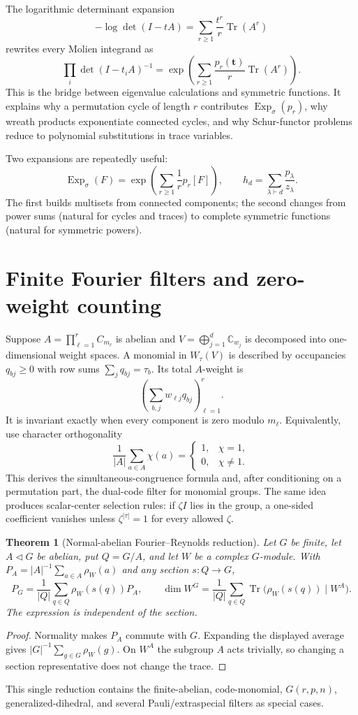 \documentclass[10pt]{article}
\newcommand{\Tr}{\operatorname{Tr}}
\newcommand{\ExpS}{\operatorname{Exp}_{\sigma}}
\newcommand{\C}{\mathbb C}
\newtheorem{theorem}{Theorem}
\begin{document}
The logarithmic determinant expansion
\[
-\log\det(I-tA)=\sum_{r\ge1}\frac{t^r}{r}\Tr(A^r)
\]
rewrites every Molien integrand as
\begin{equation}\label{eq:tool-plethystic}
\prod_i\det(I-t_iA)^{-1}
=\exp\!\left(\sum_{r\ge1}\frac{p_r(\mathbf t)}r\Tr(A^r)\right).
\end{equation}
This is the bridge between eigenvalue calculations and symmetric functions.
It explains why a permutation cycle of length $r$ contributes
$\ExpS(p_r)$, why wreath products exponentiate connected cycles, and why
Schur-functor problems reduce to polynomial substitutions in trace variables.

Two expansions are repeatedly useful:
\[
\ExpS(F)=\exp\!\left(\sum_{r\ge1}\frac1r p_r[F]\right),
\qquad
h_d=\sum_{\lambda\vdash d}\frac{p_\lambda}{z_\lambda}.
\]
The first builds multisets from connected components; the second changes from
power sums (natural for cycles and traces) to complete symmetric functions
(natural for symmetric powers).

\section{Finite Fourier filters and zero-weight counting}

Suppose $A=\prod_{\ell=1}^rC_{m_\ell}$ is abelian and
$V=\bigoplus_{j=1}^d\C_{w_j}$ is decomposed into one-dimensional weight
spaces.  A monomial in $W_\tau(V)$ is described by occupancies $q_{bj}\ge0$
with row sums $\sum_jq_{bj}=\tau_b$.  Its total $A$-weight is
\[
\left(\sum_{b,j}w_{\ell j}q_{bj}\right)_{\ell=1}^r.
\]
It is invariant exactly when every component is zero modulo $m_\ell$.
Equivalently, use character orthogonality
\[
\frac1{|A|}\sum_{a\in A}\chi(a)=
\begin{cases}1,&\chi=1,\\0,&\chi\ne1.\end{cases}
\]
This derives the simultaneous-congruence formula and, after conditioning on a
permutation part, the dual-code filter for monomial groups.  The same idea
produces scalar-center selection rules: if $\zeta I$ lies in the group, a
one-sided coefficient vanishes unless $\zeta^{|\tau|}=1$ for every allowed
$\zeta$.

\begin{theorem}[Normal-abelian Fourier--Reynolds reduction]
Let $G$ be finite, let $A\triangleleft G$ be abelian, put $Q=G/A$, and let
$W$ be a complex $G$-module. With
$P_A=|A|^{-1}\sum_{a\in A}\rho_W(a)$ and any section $s:Q\to G$,
\[
 P_G=\frac1{|Q|}\sum_{q\in Q}\rho_W(s(q))P_A,
 \qquad
 \dim W^G=\frac1{|Q|}\sum_{q\in Q}
 \Tr\bigl(\rho_W(s(q))\mid W^A\bigr).
\]
The expression is independent of the section.
\end{theorem}
\begin{proof}
Normality makes $P_A$ commute with $G$. Expanding the displayed average gives
$|G|^{-1}\sum_{g\in G}\rho_W(g)$. On $W^A$ the subgroup $A$ acts
trivially, so changing a section representative does not change the trace.
\end{proof}
This single reduction contains the finite-abelian, code-monomial,
$G(r,p,n)$, generalized-dihedral, and several Pauli/extraspecial filters as
special cases.
\end{document}
